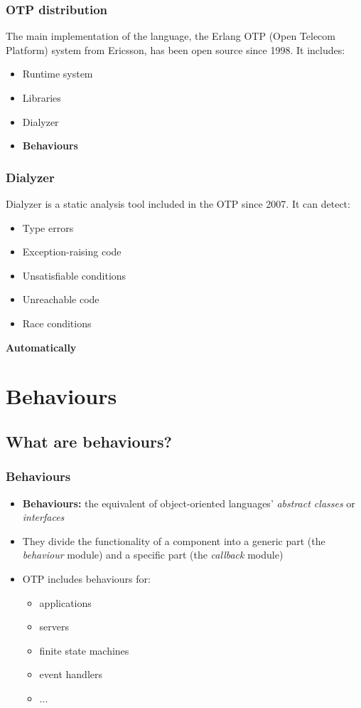 \documentclass{beamer}
\begin{document}
\begin{frame}
  \frametitle{OTP distribution} The main implementation of the
  language, the Erlang OTP (Open Telecom Platform) system from
  Ericsson, has been open source since 1998.  \pause It includes:
  \begin{itemize}
  \item Runtime system
  \item Libraries
  \item Dialyzer
  \item \textbf{Behaviours}
  \end{itemize}
\end{frame}

\begin{frame}
  \frametitle{Dialyzer} Dialyzer is a static analysis tool included in
  the OTP since 2007. It can detect:
  \begin{itemize}
  \item Type errors
  \item Exception-raising code
  \item Unsatisfiable conditions
  \item Unreachable code
  \item Race conditions
  \end{itemize}
  \pause
  \begin{center}
    \textbf{Automatically}
  \end{center}
\end{frame}

\section{Behaviours}

\subsection{What are behaviours?}

\begin{frame}
  \frametitle{Behaviours}
  \begin{itemize}
  \item \textbf{Behaviours:} the equivalent of object-oriented
    languages' \emph{abstract classes} or \emph{interfaces} \pause
  \item They divide the functionality of a component into a generic
    part (the \emph{behaviour} module) and a specific part (the
    \emph{callback} module) \pause
  \item OTP includes behaviours for:
    \begin{itemize}
    \item applications
    \item servers
    \item finite state machines
    \item event handlers
    \item ...
    \end{itemize}
  \end{itemize}
\end{frame}
\end{document}
